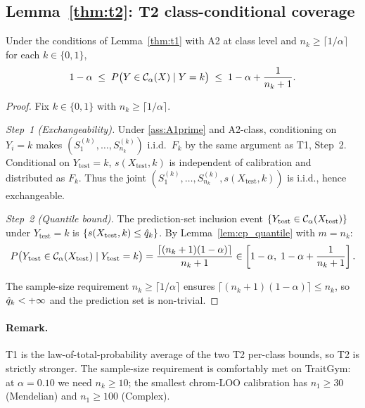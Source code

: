 \subsection{Lemma~\ref{thm:t2}: T2 class-conditional coverage}
\label{app:proofs:t2}

\begin{lemma}
\label{thm:t2}
Under the conditions of Lemma~\ref{thm:t1} with A2 at class level and $n_k \geq \lceil 1/\alpha\rceil$ for each $k \in \{0, 1\}$,
\[
1 - \alpha \;\leq\; P\bigl(Y \in \mathcal{C}_\alpha(X) \mid Y = k\bigr) \;\leq\; 1 - \alpha + \frac{1}{n_k + 1}.
\]
\end{lemma}

\begin{proof}
Fix $k \in \{0, 1\}$ with $n_k \geq \lceil 1/\alpha \rceil$.

\textit{Step~1 (Exchangeability).}
Under \ref{ass:A1prime} and A2-class, conditioning on $Y_i = k$ makes $(S_1^{(k)}, \ldots, S_{n_k}^{(k)})$ i.i.d.\ $F_k$ by the same argument as T1, Step~2. Conditional on $Y_{\mathrm{test}} = k$, $s(X_{\mathrm{test}}, k)$ is independent of calibration and distributed as $F_k$. Thus the joint $(S_1^{(k)}, \ldots, S_{n_k}^{(k)}, s(X_{\mathrm{test}}, k))$ is i.i.d., hence exchangeable.

\textit{Step~2 (Quantile bound).}
The prediction-set inclusion event $\{Y_{\mathrm{test}} \in \mathcal{C}_\alpha(X_{\mathrm{test}})\}$ under $Y_{\mathrm{test}} = k$ is $\{s(X_{\mathrm{test}}, k) \leq \hat{q}_k\}$. By Lemma~\ref{lem:cp_quantile} with $m = n_k$:
\[
P\bigl(Y_{\mathrm{test}} \in \mathcal{C}_\alpha(X_{\mathrm{test}}) \mid Y_{\mathrm{test}} = k\bigr)
= \frac{\lceil (n_k + 1)(1 - \alpha)\rceil}{n_k + 1}
\in \left[1 - \alpha,\; 1 - \alpha + \frac{1}{n_k + 1}\right].
\]

The sample-size requirement $n_k \geq \lceil 1/\alpha \rceil$ ensures $\lceil (n_k + 1)(1-\alpha)\rceil \leq n_k$, so $\hat{q}_k < +\infty$ and the prediction set is non-trivial.
\end{proof}

\paragraph{Remark.}
T1 is the law-of-total-probability average of the two T2 per-class bounds, so T2 is strictly stronger. The sample-size requirement is comfortably met on TraitGym: at $\alpha = 0.10$ we need $n_k \geq 10$; the smallest chrom-LOO calibration has $n_1 \geq 30$ (Mendelian) and $n_1 \geq 100$ (Complex).


